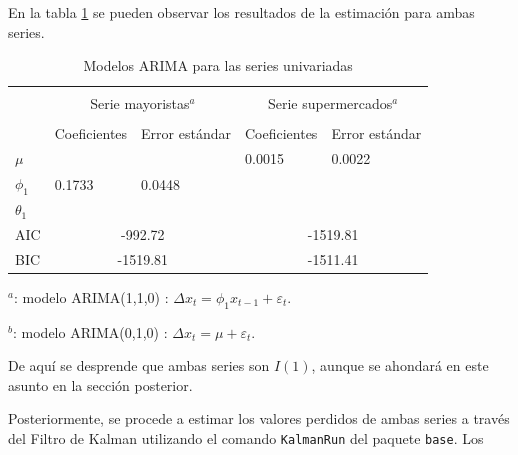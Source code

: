 \documentclass[12pt, twoside]{book}\usepackage[]{graphicx}\usepackage[]{color}
\numberwithin{equation}{section}
\numberwithin{theorem}{section}
\numberwithin{teorema}{section}
\numberwithin{defi}{section}
\numberwithin{prop}{section}
\numberwithin{defi}{section}
\theoremstyle{plain}
\begin{document}
En la tabla \ref{tab:Kalman} se pueden observar los resultados de la estimación para ambas series. 
\begin{center}
\begin{table}[!htbp]
\caption{Modelos ARIMA para las series univariadas\label{tab:Kalman}}
\centering
\begin{threeparttable}
\begin{tabular}{@{}lllll@{}}
\toprule \\
\multicolumn{1}{l}{} & \multicolumn{2}{c}{Serie mayoristas$^{a}$} &
\multicolumn{2}{c}{Serie supermercados$^{a}$} \\
\cmidrule(l){2-3} \cmidrule(l){4-5} \\
\multicolumn{1}{l}{} & \multicolumn{1}{c}{Coeficientes} &
 \multicolumn{1}{c}{Error estándar} &
\multicolumn{1}{l}{Coeficientes}&
\multicolumn{1}{l}{Error estándar}
\\
\midrule
$\mu       $ &        &          & 0.0015   &  0.0022 \\
$\phi_{1}  $ & 0.1733 &  0.0448  &          &          \\
$\theta_{1}$ &        &          &          &           \\
AIC          & \multicolumn{2}{c}{-992.72}  & \multicolumn{2}{c}{-1519.81} \\
BIC          & \multicolumn{2}{c}{-1519.81} & \multicolumn{2}{c}{-1511.41} \\
\bottomrule 
\end{tabular}
\begin{tablenotes}
\small 
\item $^{a}$: modelo ARIMA(1,1,0) : $\Delta x_{t}=\phi_{1}x_{t-1}+\varepsilon_{t}$. 
\item $^{b}$: modelo ARIMA(0,1,0) : $\Delta x_{t}=\mu+\varepsilon_{t}$. 
\end{tablenotes}
\end{threeparttable}
\end{table}
\end{center}

De aquí se desprende que ambas series son $I(1)$, aunque se ahondará en este asunto en la sección posterior. 

Posteriormente, se procede a estimar los valores perdidos de ambas series a través del Filtro de Kalman utilizando el comando \texttt{KalmanRun} del paquete \texttt{base}. Los 
\end{document}
